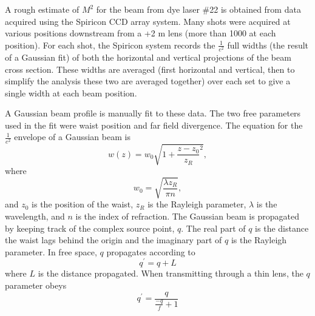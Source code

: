A rough estimate of $M^2$ for the beam from dye laser \#22 is obtained from data acquired using the Spiricon CCD array system. Many shots were acquired at various positions downstream from a +2 m lens (more than 1000 at each position). For each shot, the Spiricon system records the $\frac{1}{e^2}$ full widths (the result of a Gaussian fit) of both the horizontal and vertical projections of the beam cross section. These widths are averaged (first horizontal and vertical, then to simplify the analysis these two are averaged together) over each set to give a single width at each beam position.

A Gaussian beam profile is manually fit to these data. The two free parameters used in the fit were waist position and far field divergence. The equation for the $\frac{1}{e^2}$ envelope of a Gaussian beam is \cite{Saleh:1991a}
\begin{equation}
w(z)
=
w_0
\sqrt{
1+
\frac
{z-z_0}
{z_R}^2
},
\end{equation}
where
\begin{equation}
w_0
=
\sqrt{
\frac
{\lambda z_R}
{\pi n}
},
\end{equation}
and $z_0$ is the position of the waist, $z_R$ is the Rayleigh parameter, $\lambda$ is the wavelength, and $n$ is the index of refraction. The Gaussian beam is propagated by keeping track of the complex source point, $q$. The real part of $q$ is the distance the waist lags behind the origin and the imaginary part of $q$ is the Rayleigh parameter. In free space, $q$ propagates according to
\begin{equation}
q^\prime
=
q
+L
\label{free space}
\end{equation}
where $L$ is the distance propagated. When transmitting through a thin lens, the $q$ parameter obeys \cite{Saleh:1991a}
\begin{equation}
q^\prime
=
\frac{q}
{\frac{-q}{f}+1}
\label{thin lens}
\end{equation}
